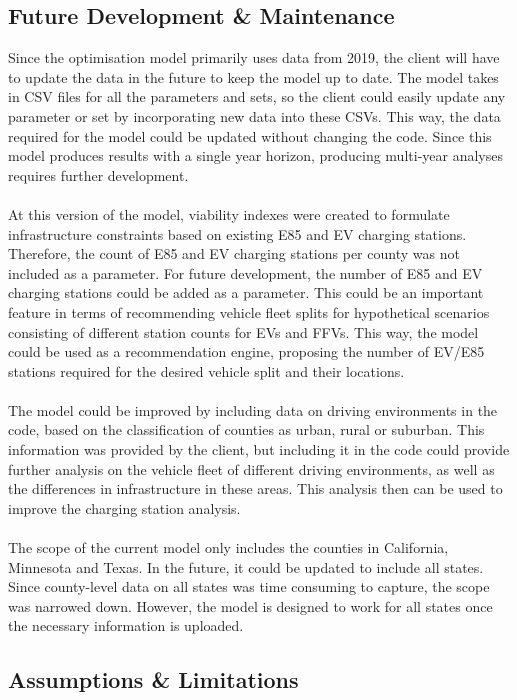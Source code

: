 \documentclass[answers]{exam}
\begin{document}
\subsection{Future Development \& Maintenance}
Since the optimisation model primarily uses data from 2019, the client will have to update the data in the future to keep the model up to date. The model takes in CSV files for all the parameters and sets, so the client could easily update any parameter or set by incorporating new data into these CSVs. This way, the data required for the model could be updated without changing the code. Since this model produces results with a single year horizon, producing multi-year analyses requires further development.
\\ ~\\
At this version of the model, viability indexes were created to formulate infrastructure constraints based on existing E85 and EV charging stations\cite{ethanol_fueling_stations}. Therefore, the count of E85 and EV charging stations per county was not included as a parameter. For future development, the number of E85 and EV charging stations could be added as a parameter. This could be an important feature in terms of recommending vehicle fleet splits for hypothetical scenarios consisting of different station counts for EVs and FFVs. This way, the model could be used as a recommendation engine, proposing the number of EV/E85 stations required for the desired vehicle split and their locations.
\\ ~\\
The model could be improved by including data on driving environments in the code, based on the classification of counties as urban, rural or suburban. This information was provided by the client, but including it in the code could provide further analysis on the vehicle fleet of different driving environments, as well as the differences in infrastructure in these areas. This analysis then can be used to improve the charging station analysis. 
\\ ~\\
The scope of the current model only includes the counties in California, Minnesota and Texas. In the future, it could be updated to include all states. Since county-level data on all states was time consuming to capture, the scope was narrowed down. However, the model is designed to work for all states once the necessary information is uploaded. 

\subsection{Assumptions \& Limitations}
\end{document}
